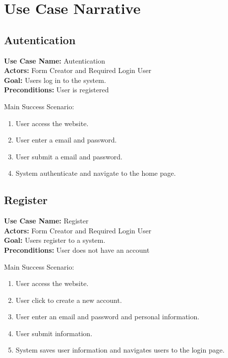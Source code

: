 \documentclass[12pt,oneside,openright,a4paper]{cpe-english-project}
\begin{document}
\section{Use Case Narrative}

\subsection{Autentication}

\textbf{Use Case Name:} Autentication \\
\textbf{Actors:} Form Creator and Required Login User \\
\textbf{Goal:} Users log in to the system. \\
\textbf{Preconditions:} User is registered

Main Success Scenario: 

\begin{enumerate}
    \item User access the website.
    \item User enter a email and password.
    \item User submit a email and password.
    \item System authenticate and navigate to the home page.
\end{enumerate}

\subsection{Register}

\textbf{Use Case Name:} Register \\
\textbf{Actors:} Form Creator and Required Login User \\
\textbf{Goal:} Users register to a system. \\
\textbf{Preconditions:} User does not have an account

Main Success Scenario: 

\begin{enumerate}
    \item User access the website.
    \item User click to create a new account.
    \item User enter an email and password and personal information.
    \item User submit information.
    \item System saves user information and navigates users to the login page.

\end{enumerate}
\end{document}
